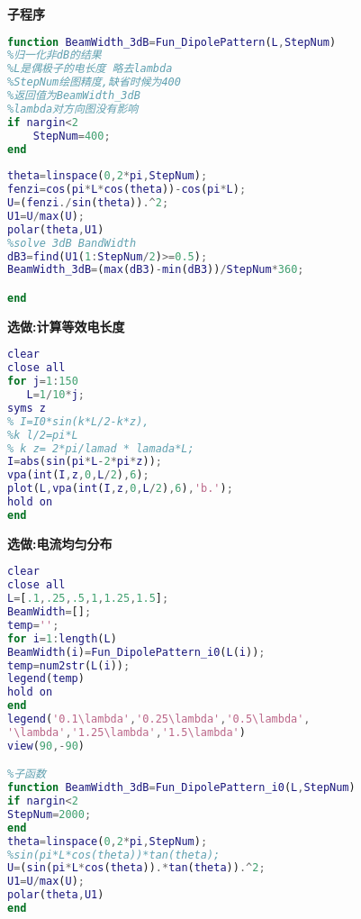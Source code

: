\noindent \textbf{子程序}
\begin{lstlisting}[language={matlab},keywordstyle=\color{blue!70},commentstyle=\color{red!50!green!50!blue!50},frame=shadowbox, rulesepcolor=\color{red!20!green!20!blue!20}] 
function BeamWidth_3dB=Fun_DipolePattern(L,StepNum)
%归一化非dB的结果
%L是偶极子的电长度 略去lambda
%StepNum绘图精度,缺省时候为400
%返回值为BeamWidth_3dB
%lambda对方向图没有影响
if nargin<2
    StepNum=400;
end
    
theta=linspace(0,2*pi,StepNum);
fenzi=cos(pi*L*cos(theta))-cos(pi*L);
U=(fenzi./sin(theta)).^2;
U1=U/max(U);
polar(theta,U1)
%solve 3dB BandWidth
dB3=find(U1(1:StepNum/2)>=0.5);
BeamWidth_3dB=(max(dB3)-min(dB3))/StepNum*360;

end
\end{lstlisting}
\noindent \textbf{选做:计算等效电长度}
\begin{lstlisting}[language={matlab},keywordstyle=\color{blue!70},commentstyle=\color{red!50!green!50!blue!50},frame=shadowbox, rulesepcolor=\color{red!20!green!20!blue!20}] 
%计算电长度
clear
close all
for j=1:150
   L=1/10*j;
syms z
% I=I0*sin(k*L/2-k*z), 
%k l/2=pi*L 
% k z= 2*pi/lamad * lamada*L;
I=abs(sin(pi*L-2*pi*z));
vpa(int(I,z,0,L/2),6);
plot(L,vpa(int(I,z,0,L/2),6),'b.');
hold on
end
\end{lstlisting}
\noindent \textbf{选做:电流均匀分布}
\begin{lstlisting}[language={matlab},keywordstyle=\color{blue!70},commentstyle=\color{red!50!green!50!blue!50},frame=shadowbox, rulesepcolor=\color{red!20!green!20!blue!20}] 
%主程序
clear
close all
L=[.1,.25,.5,1,1.25,1.5];
BeamWidth=[];
temp='';
for i=1:length(L)
BeamWidth(i)=Fun_DipolePattern_i0(L(i));
temp=num2str(L(i));
legend(temp)   
hold on 
end
legend('0.1\lambda','0.25\lambda','0.5\lambda',
'\lambda','1.25\lambda','1.5\lambda')
view(90,-90)

%子函数
function BeamWidth_3dB=Fun_DipolePattern_i0(L,StepNum)
if nargin<2
StepNum=2000;
end
theta=linspace(0,2*pi,StepNum);
%sin(pi*L*cos(theta))*tan(theta);
U=(sin(pi*L*cos(theta)).*tan(theta)).^2;
U1=U/max(U);
polar(theta,U1)
end


\end{lstlisting}